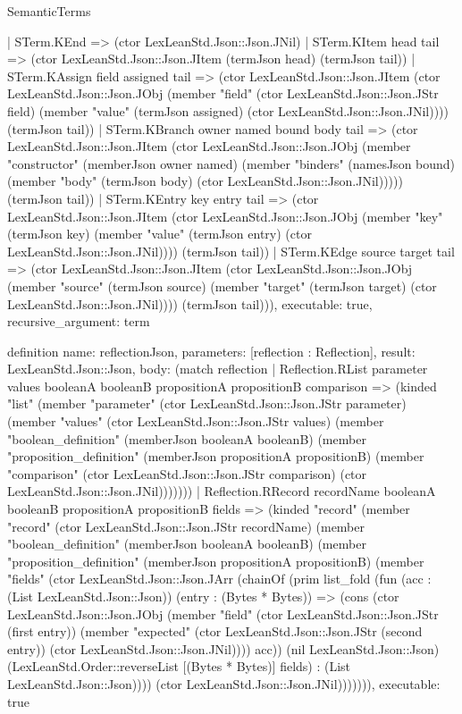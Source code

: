 \begin{lexlean}{SemanticTerms}
\begin{semanticmodule}
{    | STerm.KEnd => (ctor LexLeanStd.Json::Json.JNil)
    | STerm.KItem head tail => (ctor LexLeanStd.Json::Json.JItem (termJson head) (termJson tail))
    | STerm.KAssign field assigned tail => (ctor LexLeanStd.Json::Json.JItem (ctor LexLeanStd.Json::Json.JObj (member "field" (ctor LexLeanStd.Json::Json.JStr field) (member "value" (termJson assigned) (ctor LexLeanStd.Json::Json.JNil)))) (termJson tail))
    | STerm.KBranch owner named bound body tail => (ctor LexLeanStd.Json::Json.JItem (ctor LexLeanStd.Json::Json.JObj (member "constructor" (memberJson owner named) (member "binders" (namesJson bound) (member "body" (termJson body) (ctor LexLeanStd.Json::Json.JNil))))) (termJson tail))
    | STerm.KEntry key entry tail => (ctor LexLeanStd.Json::Json.JItem (ctor LexLeanStd.Json::Json.JObj (member "key" (termJson key) (member "value" (termJson entry) (ctor LexLeanStd.Json::Json.JNil)))) (termJson tail))
    | STerm.KEdge source target tail => (ctor LexLeanStd.Json::Json.JItem (ctor LexLeanStd.Json::Json.JObj (member "source" (termJson source) (member "target" (termJson target) (ctor LexLeanStd.Json::Json.JNil)))) (termJson tail))),
  executable: true,
  recursive_argument: term
}

definition{
  name: reflectionJson,
  parameters: [reflection : Reflection],
  result: LexLeanStd.Json::Json,
  body: (match reflection
    | Reflection.RList parameter values booleanA booleanB propositionA propositionB comparison => (kinded "list" (member "parameter" (ctor LexLeanStd.Json::Json.JStr parameter) (member "values" (ctor LexLeanStd.Json::Json.JStr values) (member "boolean_definition" (memberJson booleanA booleanB) (member "proposition_definition" (memberJson propositionA propositionB) (member "comparison" (ctor LexLeanStd.Json::Json.JStr comparison) (ctor LexLeanStd.Json::Json.JNil)))))))
    | Reflection.RRecord recordName booleanA booleanB propositionA propositionB fields => (kinded "record" (member "record" (ctor LexLeanStd.Json::Json.JStr recordName) (member "boolean_definition" (memberJson booleanA booleanB) (member "proposition_definition" (memberJson propositionA propositionB) (member "fields" (ctor LexLeanStd.Json::Json.JArr (chainOf (prim list_fold (fun (acc : (List LexLeanStd.Json::Json)) (entry : (Bytes * Bytes)) => (cons (ctor LexLeanStd.Json::Json.JObj (member "field" (ctor LexLeanStd.Json::Json.JStr (first entry)) (member "expected" (ctor LexLeanStd.Json::Json.JStr (second entry)) (ctor LexLeanStd.Json::Json.JNil)))) acc)) (nil LexLeanStd.Json::Json) (LexLeanStd.Order::reverseList [(Bytes * Bytes)] fields) : (List LexLeanStd.Json::Json)))) (ctor LexLeanStd.Json::Json.JNil))))))),
  executable: true
}


\end{semanticmodule}
\end{lexlean}
